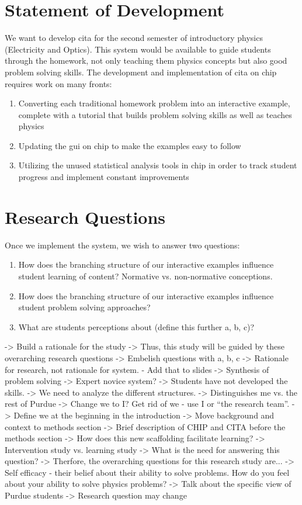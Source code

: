 \section{Statement of Development}

We want to develop \gls{cita} for the second semester of introductory physics (Electricity and Optics). This system would be available to guide students through the homework, not only teaching them physics concepts but also good problem solving skills. The development and implementation of \gls{cita} on \gls{chip} requires work on many fronts:

\begin{enumerate}
\item Converting each traditional homework problem into an interactive example, complete with a tutorial that builds problem solving skills as well as teaches physics
\item Updating the \gls{gui} on \gls{chip} to make the examples easy to follow
\item Utilizing the unused statistical analysis tools in \gls{chip} in order to track student progress and implement constant improvements
\end{enumerate}

\section{Research Questions}

Once we implement the system, we wish to answer two questions:

\begin{enumerate}
\item How does the branching structure of our interactive examples influence student learning of content? Normative vs. non-normative conceptions.
\item How does the branching structure of our interactive examples influence student problem solving approaches?
\item What are students perceptions about (define this further a, b, c)?
\end{enumerate}

-> Build a rationale for the study
-> Thus, this study will be guided by these overarching research questions
-> Embelish questions with a, b, c
-> Rationale for research, not rationale for system. - Add that to slides
-> Synthesis of problem solving
-> Expert novice system?
-> Students have not developed the skills.
-> We need to analyze the different structures.
-> Distinguishes me vs. the rest of Purdue
-> Change we to I? Get rid of we - use I or ``the research team''.
-> Define we at the beginning in the introduction
-> Move background and context to methods section
-> Brief description of CHIP and CITA before the methods section
-> How does this new scaffolding facilitate learning?
-> Intervention study vs. learning study
-> What is the need for answering this question?
-> Therfore, the overarching questions for this research study are...
-> Self efficacy - their belief about their ability to solve problems. How do you feel about your ability to solve physics problems?
-> Talk about the specific view of Purdue students
-> Research question may change